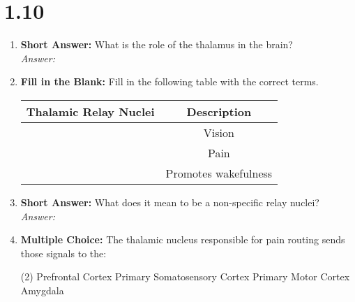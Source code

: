 \section*{1.10 \squigglyline}
\begin{enumerate}[label=\textbf{Q1.10.\arabic*}]
      \item \textbf{Short Answer:} What is the role of the thalamus in the brain? \\
            \textit{Answer:} %

      \item \textbf{Fill in the Blank:} Fill in the following table with the correct terms.
            \begin{table}[htbp]
                  \centering
                  \begin{tabular}{cc}
                        \toprule
                        \textbf{Thalamic Relay Nuclei} & \textbf{Description} \\ \midrule
                        \underline{\hspace{3cm}}       & Vision               \\
                        \underline{\hspace{3cm}}       & Pain                 \\
                        \underline{\hspace{3cm}}       & Promotes wakefulness \\
                        \bottomrule
                  \end{tabular}
            \end{table}

      \item \textbf{Short Answer:} What does it mean to be a non-specific relay nuclei? \\
            \textit{Answer:} %

      \item \textbf{Multiple Choice:} The thalamic nucleus responsible for pain routing sends those signals to the:
            \begin{tasks}[label=(\Alph*), label-width=1.5em, item-indent=1.7em](2) %
                  \task Prefrontal Cortex
                  \task Primary Somatosensory Cortex
                  \task Primary Motor Cortex
                  \task Amygdala
            \end{tasks}


\end{enumerate}
